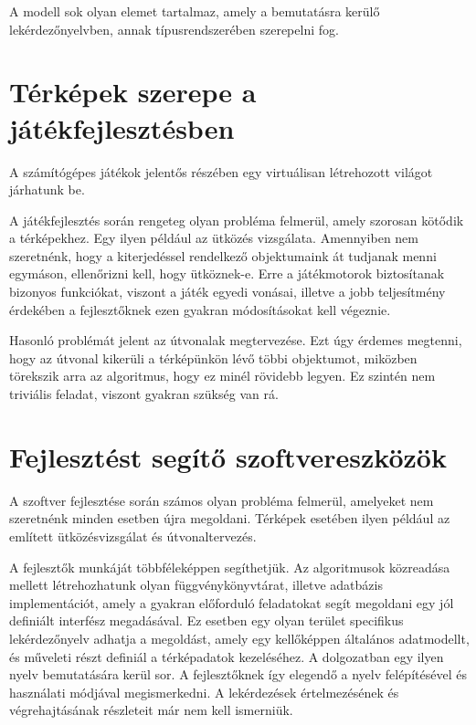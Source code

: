 A modell sok olyan elemet tartalmaz, amely a bemutatásra kerülő lekérdezőnyelvben, annak típusrendszerében szerepelni fog.


\section{Térképek szerepe a játékfejlesztésben}

A számítógépes játékok jelentős részében egy virtuálisan létrehozott világot járhatunk be.

A játékfejlesztés során rengeteg olyan probléma felmerül, amely szorosan kötődik a térképekhez. Egy ilyen például az ütközés vizsgálata. Amennyiben nem szeretnénk, hogy a kiterjedéssel rendelkező objektumaink át tudjanak menni egymáson, ellenőrizni kell, hogy ütköznek-e. Erre a játékmotorok biztosítanak bizonyos funkciókat, viszont a játék egyedi vonásai, illetve a jobb teljesítmény érdekében a fejlesztőknek ezen gyakran módosításokat kell végeznie.

Hasonló problémát jelent az útvonalak megtervezése. Ezt úgy érdemes megtenni, hogy az útvonal kikerüli a térképünkön lévő többi objektumot, miközben törekszik arra az algoritmus, hogy ez minél rövidebb legyen. Ez szintén nem triviális feladat, viszont gyakran szükség van rá.

\section{Fejlesztést segítő szoftvereszközök}

A szoftver fejlesztése során számos olyan probléma felmerül, amelyeket nem szeretnénk minden esetben újra megoldani. Térképek esetében ilyen például az említett ütközésvizsgálat és útvonaltervezés.

A fejlesztők munkáját többféleképpen segíthetjük. Az algoritmusok közreadása mellett létrehozhatunk olyan függvénykönyvtárat, illetve adatbázis implementációt, amely a gyakran előforduló feladatokat segít megoldani egy jól definiált interfész megadásával. Ez esetben egy olyan terület specifikus lekérdezőnyelv adhatja a megoldást, amely egy kellőképpen általános adatmodellt, és műveleti részt definiál a térképadatok kezeléséhez. A dolgozatban egy ilyen nyelv bemutatására kerül sor. A fejlesztőknek így elegendő a nyelv felépítésével és használati módjával megismerkedni. A lekérdezések értelmezésének és végrehajtásának részleteit már nem kell ismerniük.

